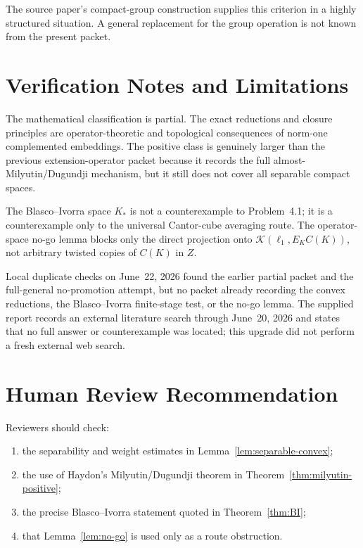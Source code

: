 \documentclass[11pt]{article}
\theoremstyle{definition}
\theoremstyle{remark}
\newcommand{\C}{C}
\newcommand{\Kop}{\mathcal K}
\begin{document}
The source paper's compact-group construction supplies this criterion in a
highly structured situation.  A general replacement for the group operation
is not known from the present packet.

\section{Verification Notes and Limitations}

The mathematical classification is partial.  The exact reductions and
closure principles are operator-theoretic and topological consequences of
norm-one complemented embeddings.  The positive class is genuinely larger
than the previous extension-operator packet because it records the full
almost-Milyutin/Dugundji mechanism, but it still does not cover all separable
compact spaces.

The Blasco--Ivorra space \(K_*\) is not a counterexample to
Problem~4.1; it is a counterexample only to the universal
Cantor-cube averaging route.  The operator-space no-go lemma blocks only the
direct projection onto \(\Kop(\ell_1,E_K\C(K))\), not arbitrary twisted
copies of \(\C(K)\) in \(Z\).

Local duplicate checks on June~22, 2026 found the earlier partial packet and
the full-general no-promotion attempt, but no packet already recording the
convex reductions, the Blasco--Ivorra finite-stage test, or the no-go lemma.
The supplied report records an external literature search through
June~20, 2026 and states that no full answer or counterexample was located;
this upgrade did not perform a fresh external web search.

\section{Human Review Recommendation}

Reviewers should check:
\begin{enumerate}
\item the separability and weight estimates in Lemma~\ref{lem:separable-convex};
\item the use of Haydon's Milyutin/Dugundji theorem in
      Theorem~\ref{thm:milyutin-positive};
\item the precise Blasco--Ivorra statement quoted in Theorem~\ref{thm:BI};
\item that Lemma~\ref{lem:no-go} is used only as a route obstruction.
\end{enumerate}
\end{document}
